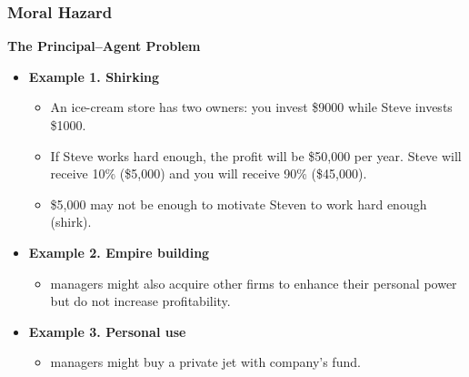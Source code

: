 \documentclass[aspectratio=169]{beamer}
\begin{document}
\begin{frame}
\frametitle{Moral Hazard}

\textbf{The Principal–Agent Problem} 
\begin{itemize}
    \medskip 
    \item \textbf{Example 1. Shirking} \pause 
    \begin{itemize}
        \item An ice-cream store has two owners: you invest \$9000 while Steve invests \$1000.
        \item If Steve works hard enough, the profit will be \$50,000 per year. Steve will receive 10\% (\$5,000) and you will receive 90\% (\$45,000).
        \item \$5,000 may not be enough to motivate Steven to work hard enough (shirk).
    \end{itemize}
    \medskip 
    \item \textbf{Example 2. Empire building} \pause 
    \begin{itemize}
        \item managers might also acquire other firms to enhance their personal power but do not increase profitability.
    \end{itemize}
    \medskip 
    \item \textbf{Example 3. Personal use} \pause 
    \begin{itemize}
        \item managers might buy a private jet with company's fund.
    \end{itemize}
\end{itemize}



\end{frame}
\end{document}
